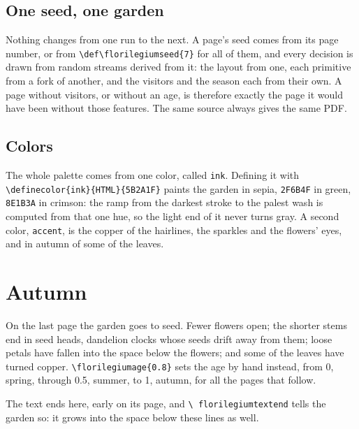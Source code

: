 \documentclass[11pt,a4paper]{article}
\newcommand\code[1]{\texttt{\small #1}}
\begin{document}
\subsection{One seed, one garden}

Nothing changes from one run to the next. A page's seed comes from
its page number, or
from \code{\textbackslash def\textbackslash florilegiumseed\{7\}} for
all of them, and
every decision is drawn from random streams derived from it: the
layout from one, each
primitive from a fork of another, and the visitors and the season
each from their own.
A page without visitors, or without an age, is therefore exactly the
page it would have
been without those features. The same source always gives the same PDF.

\subsection{Colors}

The whole palette comes from one color, called \code{ink}. Defining it with
\code{\textbackslash definecolor\{ink\}\{HTML\}\{5B2A1F\}} paints the
garden in sepia, \code{2F6B4F} in green, \code{8E1B3A} in crimson: the ramp from
the darkest stroke to the palest wash is computed from that one hue,
so the light end of
it never turns gray. A second color, \code{accent}, is the copper of
the hairlines, the
sparkles and the flowers' eyes, and in autumn of some of the leaves.

\section{Autumn}

On the last page the garden goes to seed. Fewer flowers open; the
shorter stems end in
seed heads, dandelion clocks whose seeds drift away from them; loose
petals have fallen
into the space below the flowers; and some of the leaves have turned copper.
\code{\textbackslash florilegiumage\{0.8\}} sets the age by hand
instead, from 0, spring,
through 0.5, summer, to 1, autumn, for all the pages that follow.

The text ends here, early on its page, and \code{\textbackslash
florilegiumtextend} tells
the garden so: it grows into the space below these lines as well.
\florilegiumtextend
\end{document}
